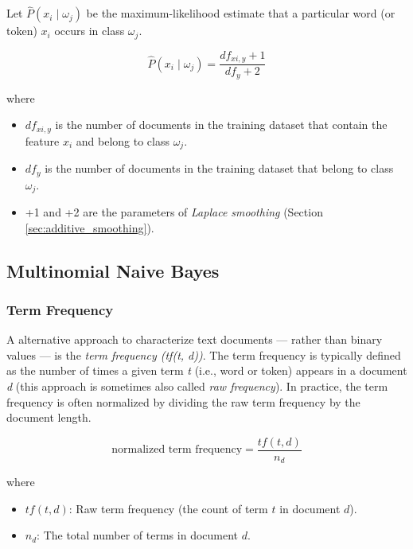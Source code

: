 \documentclass{article}
\begin{document}
Let  $\hat{P}(x_i \mid \omega_j)$ be the maximum-likelihood estimate that a particular word (or token) $x_i$ occurs in class $\omega_j$. 

\begin{equation} \hat{P}(x_i \mid \omega_j) = \frac{df_{xi, y} + 1}{df_y + 2} \end{equation} 

where

\begin{itemize}
\item $df_{xi, y}$ is the number of documents in the training dataset that contain the feature $x_i$ and belong to class $\omega_j$.
\item  $df_y$ is the number of documents in the training dataset that belong to class $\omega_j$.
\item  +1 and +2 are the parameters of \emph{Laplace smoothing} (Section \ref{sec:additive_smoothing}).
\end{itemize}

\subsection{Multinomial Naive Bayes}
\label{sec:multinomial_bayes}

\subsubsection{Term Frequency}
\label{sec:term_frequency}

A alternative approach to characterize text documents --- rather than binary values ---  is the \emph{term frequency (tf(t, d))}. The term frequency is typically defined as the number of times a given term \emph{t} (i.e., word or token) appears in a document \emph{d} (this approach is sometimes also called \emph{raw frequency}). In practice, the term frequency is often normalized by dividing the raw term frequency by the document length.

\begin{equation}\text{normalized term frequency} = \frac{tf(t, d)}{n_d}\end{equation}

where 

\begin{itemize}
\item  $tf(t, d)$: Raw term frequency (the count of term $t$ in document $d$).
\item $n_d$: The total number of terms in document $d$.
\end{itemize}
\end{document}
